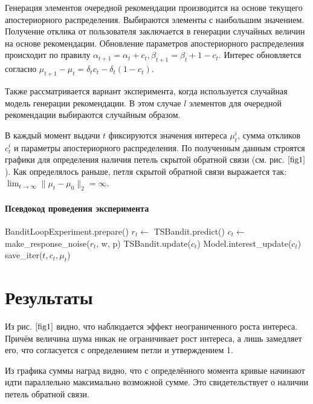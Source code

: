 \documentclass[12pt, twoside]{article}
\begin{document}
Генерация элементов очередной рекомендации производится на основе текущего апостериорного распределения. 
Выбираются элементы с наибольшим значением. 
Получение отклика от пользователя заключается в генерации случайных величин на основе рекомендации.
Обновление параметров апостериорного распределения происходит по правилу $\alpha_{t+1} = \alpha_t + c_t, \beta_{t+1} = \beta_t + 1 - c_t$. 
Интерес обновляется согласно 
$\mu_{t+1} - \mu_{t} = \delta_t c_t - \delta_t (1 - c_t)$.

Также рассматривается вариант эксперимента, когда используется случайная модель генерации рекомендации. 
В этом случае $l$ элементов для очередной рекомендации выбираются случайным образом. 

В каждый момент выдачи $t$ фиксируются значения интереса $\mu_t^i$, сумма откликов $c_t^i$ и параметры апостериорного распределения. 
По полученным данным строятся графики для определения наличия петель скрытой обратной связи (см. рис.$~\ref{fig1}$).
Как определялось раньше, петля скрытой обратной связи выражается так: $\lim_{t \to \infty} \|\mu_t - \mu_0 \|_2 = \infty$.

\paragraph{Псевдокод проведения эксперимента}
\begin{algorithmic}
  \STATE BanditLoopExperiment.prepare()
    \STATE $r_t \leftarrow$ TSBandit.predict()
    \STATE $c_t \leftarrow$ make\_response\_noise($r_t$, w, p)
    \STATE TSBandit.update($c_t$)
    \STATE Model.interest\_update($c_t$)
    \STATE save\_iter($t, c_t, \mu_t$)
  \ENDFOR
\end{algorithmic}

\section{Результаты}
Из рис.$~\ref{fig1}$ видно, что наблюдается эффект неограниченного роста интереса. 
Причём величина шума никак не ограничивает рост интереса, а лишь замедляет его, что согласуется с определением петли и утверждением 1. 

Из графика суммы наград видно, что с определённого момента кривые начинают идти параллельно максимально возможной сумме. 
Это свидетельствует о наличии петель обратной связи. 
\end{document}
